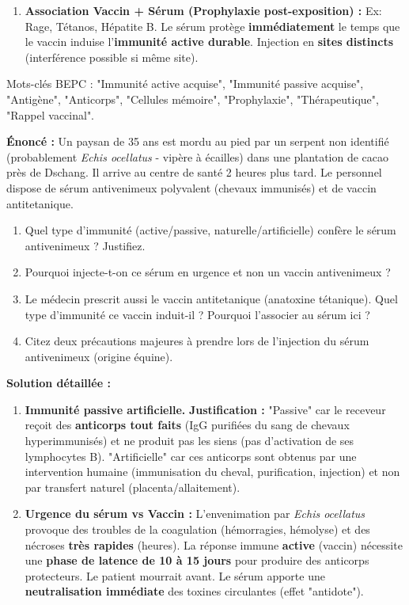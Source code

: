 \documentclass[11pt]{article}
\newcommand{\cle}[1]{{\popxbold\color{popdark}#1}}
\begin{document}
\begin{methode}
\begin{enumerate}
\begin{itemize}
 \end{itemize}
 \item \textbf{Association Vaccin + Sérum (Prophylaxie post-exposition) :} Ex: Rage, Tétanos, Hépatite B. Le sérum protège \textbf{immédiatement} le temps que le vaccin induise l'\textbf{immunité active durable}. Injection en \textbf{sites distincts} (interférence possible si même site).
\end{enumerate}
\cle{Mots-clés BEPC :} "Immunité active acquise", "Immunité passive acquise", "Antigène", "Anticorps", "Cellules mémoire", "Prophylaxie", "Thérapeutique", "Rappel vaccinal".
\end{methode}

\begin{exoresolu}
\textbf{Énoncé :} Un paysan de 35 ans est mordu au pied par un serpent non identifié (probablement \emph{Echis ocellatus} - vipère à écailles) dans une plantation de cacao près de Dschang. Il arrive au centre de santé 2 heures plus tard. Le personnel dispose de sérum antivenimeux polyvalent (chevaux immunisés) et de vaccin antitetanique.
\begin{enumerate}
 \item Quel type d'immunité (active/passive, naturelle/artificielle) confère le sérum antivenimeux ? Justifiez.
 \item Pourquoi injecte-t-on ce sérum en urgence et non un vaccin antivenimeux ?
 \item Le médecin prescrit aussi le vaccin antitetanique (anatoxine tétanique). Quel type d'immunité ce vaccin induit-il ? Pourquoi l'associer au sérum ici ?
 \item Citez deux précautions majeures à prendre lors de l'injection du sérum antivenimeux (origine équine).
\end{enumerate}
\tcblower
\textbf{Solution détaillée :}
\begin{enumerate}
 \item \textbf{Immunité passive artificielle.}
 \textbf{Justification :} "Passive" car le receveur reçoit des \textbf{anticorps tout faits} (IgG purifiées du sang de chevaux hyperimmunisés) et ne produit pas les siens (pas d'activation de ses lymphocytes B). "Artificielle" car ces anticorps sont obtenus par une intervention humaine (immunisation du cheval, purification, injection) et non par transfert naturel (placenta/allaitement).
 \item \textbf{Urgence du sérum vs Vaccin :} L'envenimation par \emph{Echis ocellatus} provoque des troubles de la coagulation (hémorragies, hémolyse) et des nécroses \textbf{très rapides} (heures). La réponse immune \textbf{active} (vaccin) nécessite une \textbf{phase de latence de 10 à 15 jours} pour produire des anticorps protecteurs. Le patient mourrait avant. Le sérum apporte une \textbf{neutralisation immédiate} des toxines circulantes (effet "antidote").

\end{enumerate}
\end{exoresolu}
\end{document}

